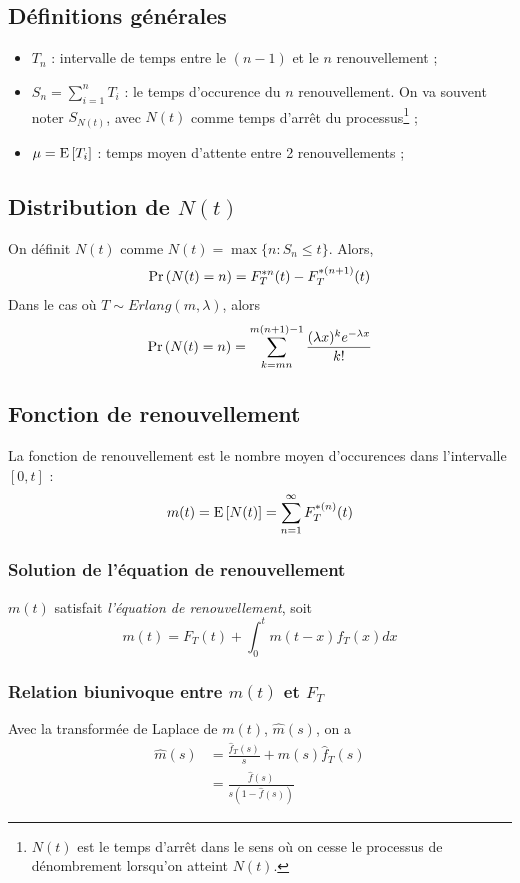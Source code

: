 \documentclass[10pt, french]{article}
\begin{document}
\begin{multicols*}{2}
\subsection*{Définitions générales}
\begin{itemize}
\item $T_n$ : intervalle de temps entre le $(n-1)$ et le $n$ renouvellement ;
\item $S_n = \sum_{i=1}^{n} T_i$ : le temps d'occurence du $n$ renouvellement. On va souvent noter $S_{N(t)}$, avec $N(t)$ comme temps d'arrêt du processus\footnote{$N(t)$ est le temps d'arrêt dans le sens où on cesse le processus de dénombrement lorsqu'on atteint $N(t)$.} ;

\item $\mu = \mathrm{E} \left[ T_i \right]$ : temps moyen d'attente entre 2 renouvellements ;
\end{itemize}

\subsection*{Distribution de $N(t)$}
On définit $N(t)$ comme $N(t) = \max \{ n : S_n \leq t \}$. Alors,
\begin{align*}
\Pr \left( N(t) = n \right) = F_T^{\ast n}(t) - F_T^{\ast(n+1)}(t)
\end{align*}
Dans le cas où $T \sim Erlang(m, \lambda)$, alors
\[\Pr \left( N(t) = n \right)  = \sum_{k=mn}^{m(n+1) - 1} \frac{(\lambda x)^k e^{-\lambda x}}{k!} \]

\subsection*{Fonction de renouvellement}
La fonction de renouvellement est le nombre moyen d'occurences dans l'intervalle $[0,t]$  :
\[m(t) = \mathrm{E} \left[ N(t) \right] = \sum_{n=1}^{\infty} F_T^{\ast(n)}(t)  \]

\subsubsection*{Solution de l'équation de renouvellement}
$m(t)$ satisfait \emph{l'équation de renouvellement}, soit
\[m(t) = F_T(t) + \int_{0}^{t} m(t-x) f_T(x) dx  \]

\subsubsection*{Relation biunivoque entre $m(t)$ et $F_T$}
Avec la transformée de Laplace de $m(t)$, $\hat{m}(s)$, on a
\begin{align*}
\hat{m}(s) &  = \frac{\hat{f}_T(s)}{s} + \hat{m}(s) \hat{f}_T(s) \\
& = \frac{\hat{f}(s)}{s\left(1 - \hat{f}(s)    \right)}
\end{align*}



\end{multicols*}
\end{document}
